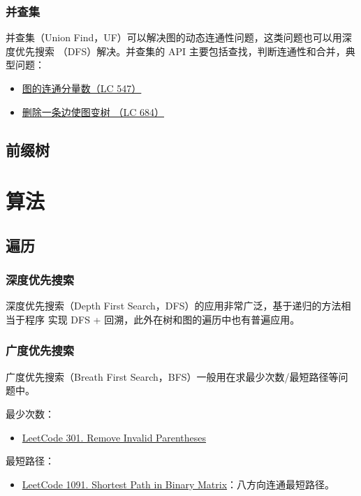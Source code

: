\subsection{并查集}
并查集（Union Find，UF）可以解决图的动态连通性问题，这类问题也可以用深度优先搜索
（DFS）解决。并查集的 API 主要包括查找，判断连通性和合并，典型问题：

\begin{itemize}
  \item 
    \href{https://leetcode.com/problems/friend-circles}{图的连通分量数（LC 547）}
  \item
    \href{https://leetcode.com/problems/redundant-connection}{删除一条边使图变树
      （LC 684）}
\end{itemize}

\section{前缀树}

\chapter{算法}
\section{遍历}
\subsection{深度优先搜索}
深度优先搜索（Depth First Search，DFS）的应用非常广泛，基于递归的方法相当于程序
实现 DFS + 回溯，此外在树和图的遍历中也有普遍应用。

\subsection{广度优先搜索}
广度优先搜索（Breath First Search，BFS）一般用在求最少次数/最短路径等问题中。

最少次数：
\begin{itemize}
  \item
    \href{https://leetcode.com/problems/remove-invalid-parentheses/}{LeetCode 301. Remove Invalid Parentheses}
\end{itemize}

最短路径：
\begin{itemize}
  \item
    \href{https://leetcode.com/problems/shortest-path-in-binary-matrix/}{LeetCode
      1091. Shortest Path in Binary Matrix}：八方向连通最短路径。
\end{itemize}


